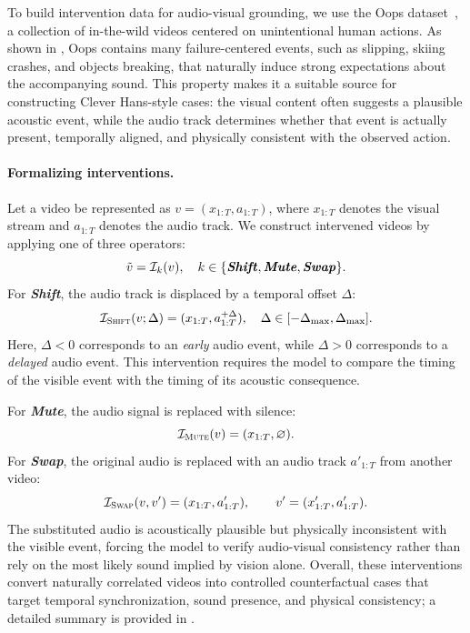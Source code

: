 \documentclass{llmxive}
\providecommand{\shift}{\textbf{\textit{Shift}}\xspace}
\providecommand{\mute}{\textbf{\textit{Mute}}\xspace}
\providecommand{\swap}{\textbf{\textit{Swap}}\xspace}
\begin{document}
To build intervention data for audio-visual grounding, we use the Oops dataset~\cite{Epstein2019OopsPU}, a collection of in-the-wild videos centered on unintentional human actions. As shown in , Oops contains many failure-centered events, such as slipping, skiing crashes, and objects breaking, that naturally induce strong expectations about the accompanying sound. This property makes it a suitable source for constructing Clever Hans-style cases: the visual content often suggests a plausible acoustic event, while the audio track determines whether that event is actually present, temporally aligned, and physically consistent with the observed action.

\paragraph{Formalizing interventions.}
Let a video be represented as $v=(x_{1:T}, a_{1:T})$, where $x_{1:T}$ denotes the visual stream and $a_{1:T}$ denotes the audio track. We construct intervened videos by applying one of three operators:
\begin{equation}
\tilde{v} =
\mathcal{I}_{k}(v), \quad
k \in \{\shift, \mute, \swap\}.
\end{equation}
For \shift, the audio track is displaced by a temporal offset $\Delta$:
\begin{equation}
\mathcal{I}_{\textsc{Shift}}(v;\Delta) = (x_{1:T}, a_{1:T}^{+\Delta}),
\quad \Delta \in [-\Delta_{\max}, \Delta_{\max}].
\end{equation}
Here, $\Delta<0$ corresponds to an \textit{early} audio event, while $\Delta>0$ corresponds to a \textit{delayed} audio event. This intervention requires the model to compare the timing of the visible event with the timing of its acoustic consequence.


For \mute, the audio signal is replaced with silence:
\begin{equation}
\mathcal{I}_{\textsc{Mute}}(v) = (x_{1:T}, \varnothing).
\end{equation}
For \swap, the original audio is replaced with an audio track $a'_{1:T}$ from another video:
\begin{equation}
    \mathcal{I}_{\textsc{Swap}}(v, v')
    =
    (x_{1:T}, a'_{1:T}),
    \qquad
    v' = (x'_{1:T}, a'_{1:T}).
\end{equation}
The substituted audio is acoustically plausible but physically inconsistent with the visible event, forcing the model to verify audio-visual consistency rather than rely on the most likely sound implied by vision alone.
Overall, these interventions convert naturally correlated videos into controlled counterfactual cases that target temporal synchronization, sound presence, and physical consistency; a detailed summary is provided in .
\end{document}
